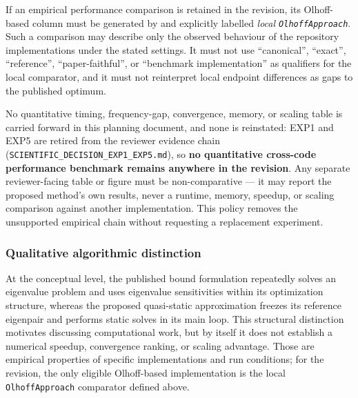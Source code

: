 \documentclass[12pt,a4paper]{article}
\begin{document}
If an empirical performance comparison is retained in the revision, its
Olhoff-based column must be generated by and explicitly labelled
\emph{local \texttt{OlhoffApproach}}.  Such a comparison may describe only
the observed behaviour of the repository implementations under the stated
settings.  It must not use ``canonical'', ``exact'', ``reference'',
``paper-faithful'', or ``benchmark implementation'' as qualifiers for the
local comparator, and it must not reinterpret local endpoint differences as
gaps to the published optimum.

No quantitative timing, frequency-gap, convergence, memory, or scaling
table is carried forward in this planning document, and none is reinstated:
EXP1 and EXP5 are retired from the reviewer evidence chain
(\texttt{SCIENTIFIC\_DECISION\_EXP1\_EXP5.md}), so \textbf{no quantitative
cross-code performance benchmark remains anywhere in the revision}.  Any
separate reviewer-facing table or figure must be non-comparative --- it may
report the proposed method's own results, never a runtime, memory, speedup, or
scaling comparison against another implementation.  This policy removes the
unsupported empirical chain without requesting a replacement experiment.

\subsubsection*{Qualitative algorithmic distinction}

At the conceptual level, the published bound formulation repeatedly solves
an eigenvalue problem and uses eigenvalue sensitivities within its
optimization structure, whereas the proposed quasi-static approximation
freezes its reference eigenpair and performs static solves in its main loop.
This structural distinction motivates discussing computational work, but by
itself it does not establish a numerical speedup, convergence ranking, or
scaling advantage.  Those are empirical properties of specific
implementations and run conditions; for the revision, the only eligible
Olhoff-based implementation is the local \texttt{OlhoffApproach} comparator
defined above.


\end{document}
